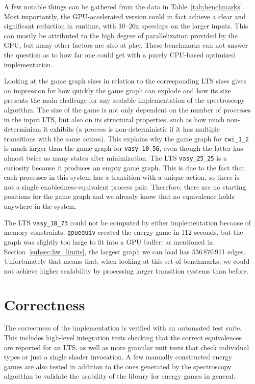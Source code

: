 A few notable things can be gathered from the data in
Table~\ref{tab:benchmarks}.
Most importantly, the GPU-accelerated version could in fact achieve
a clear and significant reduction in runtime,
with 10--20x speedups on the larger inputs.
This can mostly be attributed to the high degree of parallelization provided by
the GPU,
but many other factors are also at play.
These benchmarks can not answer the question as to how far one could get with
a purely CPU-based optimized implementation.

Looking at the game graph sizes in relation to the corresponding LTS sizes
gives an impression for how quickly the game graph can explode
and how its size presents the main challenge for any scalable implementation of
the spectroscopy algorithm.
The size of the game is not only dependent on the number of processes in the
input LTS,
but also on its structural properties,
such as how much non-determinism it exhibits
(a process is non-deterministic if it has multiple transitions with the same
action).
This explains why the game graph for \texttt{cwi\_1\_2} is much larger
than the game graph for \texttt{vasy\_10\_56},
even though the latter has almost twice as many states after minimization.
The LTS \texttt{vasy\_25\_25} is a curiosity
because it produces an empty game graph.
This is due to the fact that each processes in this system has a transition
with a unique action,
so there is not a single enabledness-equivalent process pair.
Therefore, there are no starting positions for the game graph and we already
know that no equivalence holds anywhere in the system.

The LTS \texttt{vasy\_18\_73} could not be computed by either implementation
because of memory constraints.
\texttt{gpuequiv} created the energy game in 112 seconds,
but the graph was slightly too large to fit into a GPU buffer:
as mentioned in Section~\ref{subsec:hw_limits},
the largest graph we can load has 536\,870\,911 edges.
Unfortunately that means that,
when looking at this set of benchmarks,
we could not achieve higher scalability by processing larger transition systems
than before.

\section{Correctness}

The correctness of the implementation is verified with an automated test suite.
This includes high-level integration tests checking that the correct
equivalences are reported for an LTS,
as well as more granular unit tests that check individual types or just a
single shader invocation.
A few manually constructed energy games are also tested in addition to the ones
generated by the spectroscopy algorithm
to validate the usability of the library for energy games in general.

